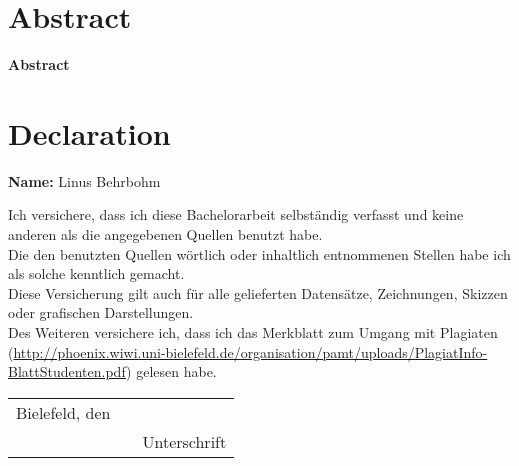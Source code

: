 
\section*{Abstract}\label{sec:abstract}
\begin{center}
\bf{Abstract}
\end{center}

\newpage


\section*{Declaration}\label{sec:declaration}
{\bf Name:} Linus Behrbohm 

\vspace{2cm}


Ich versichere, dass ich diese Bachelorarbeit selbst\"andig verfasst und keine anderen als die angegebenen Quellen benutzt habe. \\
Die den benutzten Quellen w\"ortlich oder inhaltlich entnommenen Stellen habe ich als solche kenntlich gemacht. \\
Diese Versicherung gilt auch f\"ur alle gelieferten Datens\"atze, Zeichnungen, Skizzen oder grafischen Darstellungen.\\
Des Weiteren versichere ich, dass ich das Merkblatt zum Umgang mit Plagiaten (\href{http://phoenix.wiwi.uni-bielefeld.de/organisation/pamt/uploads/PlagiatInfo-BlattStudenten.pdf}{http://phoenix.wiwi.uni-bielefeld.de/organisation/pamt/uploads/PlagiatInfo-BlattStudenten.pdf})
gelesen habe.

\vspace{2cm} 


\begin{tabular}{lp{2em}l} 
Bielefeld, den \date \today    && \hspace{4cm} \\\cline{1-1}\cline{3-3} 
   && Unterschrift 
\end{tabular}  